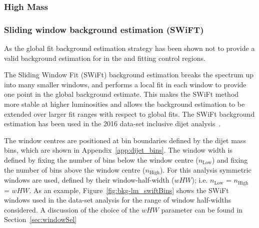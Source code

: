 \subsubsection{High Mass}
\label{sec:highmass_globalFit}

\newpage
\subsubsection{Sliding window background estimation (SWiFT)}
\label{sec:swift}

As the global fit background estimation strategy has been shown not to provide a
valid background estimation for in the \hm{} and \lm{} fitting control regions.

The Sliding Window Fit (SWiFt) background estimation breaks the spectrum up into many smaller windows,
and performs a local fit in each window to provide one point in the global background \mjj{} estimate. 
This makes the SWiFt method more stable at higher luminosities
and allows the background estimation to be extended over larger fit ranges with respect to global fits.
The SWiFt background estimation has been used in the 2016 data-set inclusive dijet analysis~\cite{dijet_mori17_paper}.

The window centres are positioned at bin boundaries defined by the dijet mass bins, which are shown in Appendix~\ref{app:dijet_bins}.
The window width is defined by fixing the number of bins below the window centre ($n_{\text{Low}}$)
and fixing the number of bins above the window centre ($n_{\text{High}}$).
For this analysis symmetric windows are used, defined by their window-half-width ($wHW$); i.e. $n_{\text{Low}}$ = $n_{\text{High}}$ = $wHW$.
As an example, Figure~\ref{fig:bkg-lm_swiftBins} shows the SWiFt windows used in the \lm{} data-set analysis for the range of window half-widths considered.
A discussion of the choice of the $wHW$ parameter can be found in Section~\ref{sec:windowSel}

